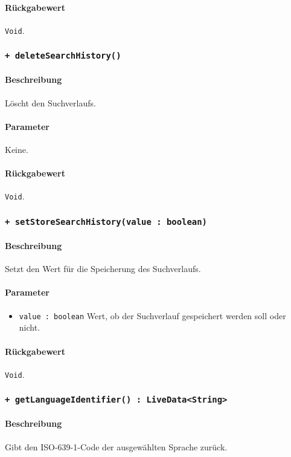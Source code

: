 \paragraph*{Rückgabewert}
\texttt{Void}.

\subsubsection*{\texttt{+ deleteSearchHistory()}}%
\paragraph*{Beschreibung}
Löscht den Suchverlaufs.
\paragraph*{Parameter}
Keine.
\paragraph*{Rückgabewert}
\texttt{Void}.

\subsubsection*{\texttt{+ setStoreSearchHistory(value : boolean)}}%
\paragraph*{Beschreibung}
Setzt den Wert für die Speicherung des Suchverlaufs.
\paragraph*{Parameter}
\begin{itemize}
    \item \texttt{value : boolean} Wert, ob der Suchverlauf gespeichert werden soll oder nicht.
\end{itemize}
\paragraph*{Rückgabewert}
\texttt{Void}.

\subsubsection*{\texttt{+ getLanguageIdentifier() : LiveData<String>}}%
\paragraph*{Beschreibung}
Gibt den ISO-639-1-Code der ausgewählten Sprache zurück.
